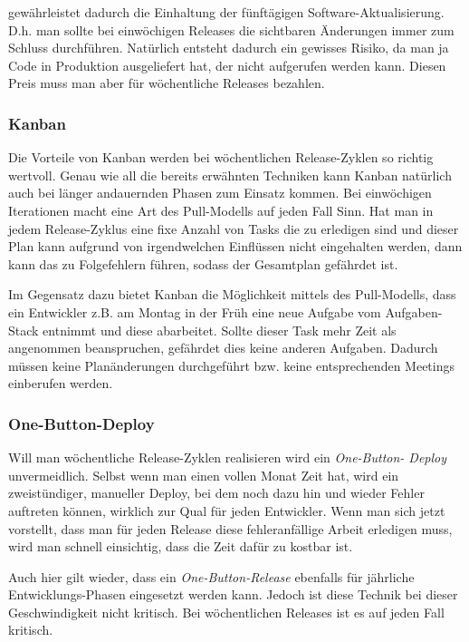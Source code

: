 gewährleistet dadurch die Einhaltung der fünftägigen Software-Aktualisierung.
D.h. man sollte bei einwöchigen Releases die sichtbaren Änderungen immer zum
Schluss durchführen. Natürlich entsteht dadurch ein gewisses Risiko, da man ja
Code in Produktion ausgeliefert hat, der nicht aufgerufen werden kann. Diesen
Preis muss man aber für wöchentliche Releases bezahlen.

\subsubsection{Kanban}
Die Vorteile von Kanban werden bei wöchentlichen Release-Zyklen so richtig
wertvoll. Genau wie all die bereits erwähnten Techniken kann Kanban natürlich
auch bei länger andauernden Phasen zum Einsatz kommen. Bei einwöchigen
Iterationen macht eine Art des Pull-Modells auf jeden Fall Sinn. Hat man in
jedem Release-Zyklus eine fixe Anzahl von Tasks die zu erledigen sind und
dieser Plan kann aufgrund von irgendwelchen Einflüssen nicht eingehalten
werden, dann kann das zu Folgefehlern führen, sodass der Gesamtplan gefährdet
ist.

Im Gegensatz dazu bietet Kanban die Möglichkeit mittels des Pull-Modells, dass
ein Entwickler z.B. am Montag in der Früh eine neue Aufgabe vom Aufgaben-Stack
entnimmt und diese abarbeitet. Sollte dieser Task mehr Zeit als angenommen
beanspruchen, gefährdet dies keine anderen Aufgaben. Dadurch müssen keine
Planänderungen durchgeführt bzw. keine entsprechenden Meetings einberufen
werden.

\subsubsection{One-Button-Deploy}

Will man wöchentliche Release-Zyklen realisieren wird ein \emph{One-Button-
Deploy} unvermeidlich. Selbst wenn man einen vollen Monat Zeit hat, wird ein
zweistündiger, manueller Deploy, bei dem noch dazu hin und wieder Fehler
auftreten können, wirklich zur Qual für jeden Entwickler. Wenn man sich jetzt
vorstellt, dass man für jeden Release diese fehleranfällige Arbeit erledigen
muss, wird man schnell einsichtig, dass die Zeit dafür zu kostbar ist.

Auch hier gilt wieder, dass ein \emph{One-Button-Release} ebenfalls für
jährliche Entwicklungs-Phasen eingesetzt werden kann. Jedoch ist diese Technik
bei dieser Geschwindigkeit nicht kritisch. Bei wöchentlichen Releases ist es
auf jeden Fall kritisch.

